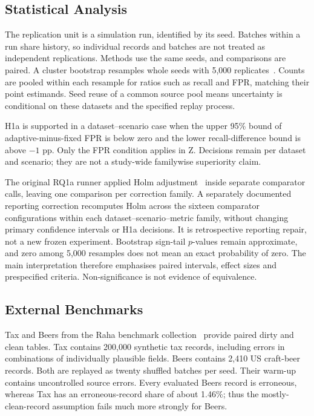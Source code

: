 \subsection{Statistical Analysis}

The replication unit is a simulation run, identified by its seed. Batches within a run share history, so individual records and batches are not treated as independent replications. Methods use the same seeds, and comparisons are paired. A cluster bootstrap resamples whole seeds with 5,000 replicates~\cite{FieldWelsh2007}. Counts are pooled within each resample for ratios such as recall and FPR, matching their point estimands. Seed reuse of a common source pool means uncertainty is conditional on these datasets and the specified replay process.

H1a is supported in a dataset--scenario case when the upper 95\% bound of adaptive-minus-fixed FPR is below zero and the lower recall-difference bound is above $-1$ pp. Only the FPR condition applies in Z. Decisions remain per dataset and scenario; they are not a study-wide familywise superiority claim.

The original RQ1a runner applied Holm adjustment~\cite{Holm1979} inside separate comparator calls, leaving one comparison per correction family. A separately documented reporting correction recomputes Holm across the sixteen comparator configurations within each dataset--scenario--metric family, without changing primary confidence intervals or H1a decisions. It is retrospective reporting repair, not a new frozen experiment. Bootstrap sign-tail $p$-values remain approximate, and zero among 5,000 resamples does not mean an exact probability of zero. The main interpretation therefore emphasises paired intervals, effect sizes and prespecified criteria. Non-significance is not evidence of equivalence.

\subsection{External Benchmarks}
\label{sec:design:external}

Tax and Beers from the Raha benchmark collection~\cite{Mahdavi2019} provide paired dirty and clean tables. Tax contains 200,000 synthetic tax records, including errors in combinations of individually plausible fields. Beers contains 2,410 US craft-beer records. Both are replayed as twenty shuffled batches per seed. Their warm-up contains uncontrolled source errors. Every evaluated Beers record is erroneous, whereas Tax has an erroneous-record share of about 1.46\%; thus the mostly-clean-record assumption fails much more strongly for Beers.

